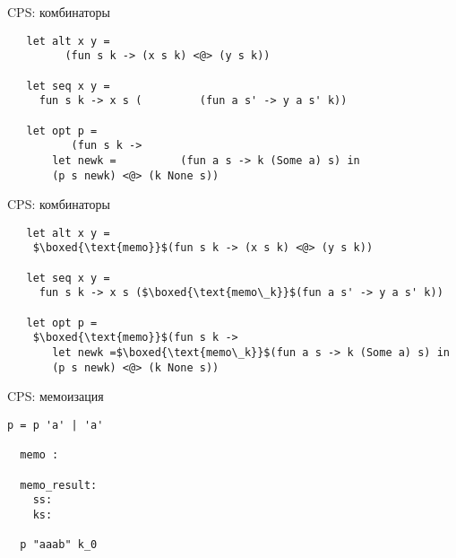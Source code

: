 \documentclass[10pt, mathserif]{beamer}
\theoremstyle{definition}
\begin{document}
\begin{frame}[fragile]{CPS: комбинаторы}

  \begin{lstlisting}
   let alt x y =
         (fun s k -> (x s k) <@> (y s k))

   let seq x y =
     fun s k -> x s (         (fun a s' -> y a s' k))

   let opt p =
          (fun s k ->
       let newk =          (fun a s -> k (Some a) s) in
       (p s newk) <@> (k None s))

  \end{lstlisting}

\end{frame}

\begin{frame}[fragile]{CPS: комбинаторы}

  \begin{lstlisting}
   let alt x y =
    $\boxed{\text{memo}}$(fun s k -> (x s k) <@> (y s k))

   let seq x y =
     fun s k -> x s ($\boxed{\text{memo\_k}}$(fun a s' -> y a s' k))

   let opt p =
    $\boxed{\text{memo}}$(fun s k ->
       let newk =$\boxed{\text{memo\_k}}$(fun a s -> k (Some a) s) in
       (p s newk) <@> (k None s))

  \end{lstlisting}

\end{frame}
%
%
%

\begin{frame}[fragile]{CPS: мемоизация}

\begin{lstlisting}[basicstyle=\small]
  p = p 'a' | 'a'

  memo :

  memo_result:
    ss:
    ks:

  p "aaab" k_0
\end{lstlisting}

\end{frame}
\end{document}
